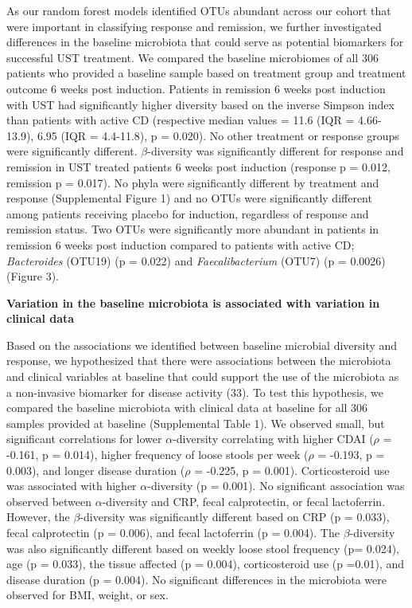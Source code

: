 \documentclass[11pt,]{article}
\begin{document}
As our random forest models identified OTUs abundant across our cohort
that were important in classifying response and remission, we further
investigated differences in the baseline microbiota that could serve as
potential biomarkers for successful UST treatment. We compared the
baseline microbiomes of all 306 patients who provided a baseline sample
based on treatment group and treatment outcome 6 weeks post induction.
Patients in remission 6 weeks post induction with UST had significantly
higher diversity based on the inverse Simpson index than patients with
active CD (respective median values = 11.6 (IQR = 4.66-13.9), 6.95 (IQR
= 4.4-11.8), p = 0.020). No other treatment or response groups were
significantly different. \({\beta}\)-diversity was significantly
different for response and remission in UST treated patients 6 weeks
post induction (response p = 0.012, remission p = 0.017). No phyla were
significantly different by treatment and response (Supplemental Figure
1) and no OTUs were significantly different among patients receiving
placebo for induction, regardless of response and remission status. Two
OTUs were significantly more abundant in patients in remission 6 weeks
post induction compared to patients with active CD; \emph{Bacteroides}
(OTU19) (p = 0.022) and \emph{Faecalibacterium} (OTU7) (p = 0.0026)
(Figure 3).

\textbf{Variation in the baseline microbiota is associated with
variation in clinical data}

Based on the associations we identified between baseline microbial
diversity and response, we hypothesized that there were associations
between the microbiota and clinical variables at baseline that could
support the use of the microbiota as a non-invasive biomarker for
disease activity (33). To test this hypothesis, we compared the baseline
microbiota with clinical data at baseline for all 306 samples provided
at baseline (Supplemental Table 1). We observed small, but significant
correlations for lower \({\alpha}\)-diversity correlating with higher
CDAI (\({\rho}\) = -0.161, p = 0.014), higher frequency of loose stools
per week (\({\rho}\) = -0.193, p = 0.003), and longer disease duration
(\({\rho}\) = -0.225, p = 0.001). Corticosteroid use was associated with
higher \({\alpha}\)-diversity (p = 0.001). No significant association
was observed between \({\alpha}\)-diversity and CRP, fecal calprotectin,
or fecal lactoferrin. However, the \({\beta}\)-diversity was
significantly different based on CRP (p = 0.033), fecal calprotectin (p
= 0.006), and fecal lactoferrin (p = 0.004). The \({\beta}\)-diversity
was also significantly different based on weekly loose stool frequency
(p= 0.024), age (p = 0.033), the tissue affected (p = 0.004),
corticosteroid use (p =0.01), and disease duration (p = 0.004). No
significant differences in the microbiota were observed for BMI, weight,
or sex.
\end{document}
